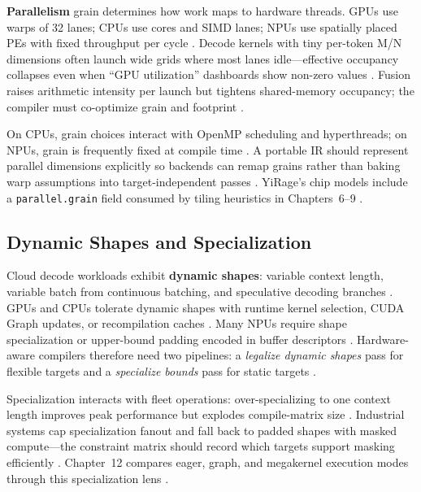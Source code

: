 \textbf{Parallelism} grain determines how work maps to hardware threads.
GPUs use warps of 32 lanes; CPUs use cores and SIMD lanes; NPUs use spatially placed PEs with fixed throughput per cycle \citep{nvidia2022hopper,amd2024aie,dlbook}.
Decode kernels with tiny per-token M/N dimensions often launch wide grids where most lanes idle---effective occupancy collapses even when ``GPU utilization'' dashboards show non-zero values \citep{patel2025llminference,memoryfloor2026}.
Fusion raises arithmetic intensity per launch but tightens shared-memory occupancy; the compiler must co-optimize grain and footprint \citep{nvidia2022hopper,semianalysis2024tma}.

On CPUs, grain choices interact with OpenMP scheduling and hyperthreads; on NPUs, grain is frequently fixed at compile time \citep{amd2024xdna,dlbook}.
A portable IR should represent parallel dimensions explicitly so backends can remap grains rather than baking warp assumptions into target-independent passes \citep{patel2025llminference}.
YiRage's chip models include a \texttt{parallel.grain} field consumed by tiling heuristics in Chapters~6--9 \citep{amd2024xdna,nvidia2022hopper}.

\subsection{Dynamic Shapes and Specialization}
\label{sec:ch03_dynamic_shapes}

Cloud decode workloads exhibit \textbf{dynamic shapes}: variable context length, variable batch from continuous batching, and speculative decoding branches \citep{kwon2023vllm,patel2025llminference}.
GPUs and CPUs tolerate dynamic shapes with runtime kernel selection, CUDA Graph updates, or recompilation caches \citep{nvidia2024cudagraphs,kwon2023vllm}.
Many NPUs require shape specialization or upper-bound padding encoded in buffer descriptors \citep{amd2024xdna}.
Hardware-aware compilers therefore need two pipelines: a \emph{legalize dynamic shapes} pass for flexible targets and a \emph{specialize bounds} pass for static targets \citep{amd2024aie,patel2025llminference}.

Specialization interacts with fleet operations: over-specializing to one context length improves peak performance but explodes compile-matrix size \citep{nvidia2024cudagraphs,memoryfloor2026}.
Industrial systems cap specialization fanout and fall back to padded shapes with masked compute---the constraint matrix should record which targets support masking efficiently \citep{patel2025llminference,amd2024xdna}.
Chapter~12 compares eager, graph, and megakernel execution modes through this specialization lens \citep{nvidia2024cudagraphs}.

